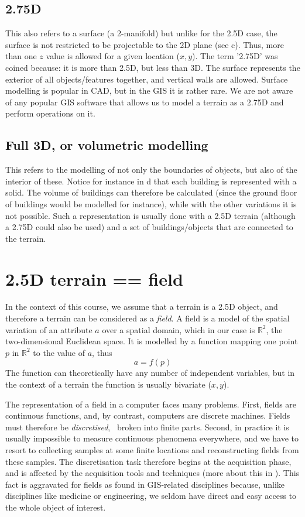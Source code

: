 \subsection{2.75D} 
This also refers to a surface (a 2-manifold) but unlike for the 2.5D case, the surface is not restricted to be projectable to the 2D plane (see c).
Thus, more than one $z$ value is allowed for a given location ($x,y$).
The term '2.75D' was coined because: it is more than 2.5D, but less than 3D.
The surface represents the exterior of all objects/features together, and vertical walls are allowed.
Surface modelling is popular in CAD, but in the GIS it is rather rare.
We are not aware of any popular GIS software that allows us to model a terrain as a 2.75D and perform operations on it.

\subsection{Full 3D, or volumetric modelling} 
This refers to the modelling of not only the boundaries of objects, but also of the interior of these.
Notice for instance in d that each building is represented with a solid.
The volume of buildings can therefore be calculated (since the ground floor of buildings would be modelled for instance), while with the other variations it is not possible. 
Such a representation is usually done with a 2.5D terrain (although a 2.75D could also be used) and a set of buildings/objects that are connected to the terrain.



%
\section{2.5D terrain == field}

In the context of this course, we assume that a terrain is a 2.5D object, and therefore a terrain can be considered as a \emph{field}.
A field is a model of the spatial variation of an attribute $a$ over a spatial domain, which in our case is $\mathbb{R}^2$, the two-dimensional Euclidean space.
It is modelled by a function mapping one point $p$ in $\mathbb{R}^2$ to the value of $a$, thus 
\[
  a = f(p)
\]
The function can theoretically have any number of independent variables, but in the context of a terrain the function is usually bivariate ($x,y$).

%

The representation of a field in a computer faces many problems. 
First, fields are continuous functions, and, by contrast, computers are discrete machines. 
Fields must therefore be \emph{discretised}, \ie\ broken into finite parts.
Second, in practice it is usually impossible to measure continuous phenomena everywhere, and we have to resort to collecting samples at some finite locations and reconstructing fields from these samples.
The discretisation task therefore begins at the acquisition phase, and is affected by the acquisition tools and techniques (more about this in ).
This fact is aggravated for fields as found in GIS-related disciplines because, unlike disciplines like medicine or engineering, we seldom have direct and easy access to the whole object of interest.


